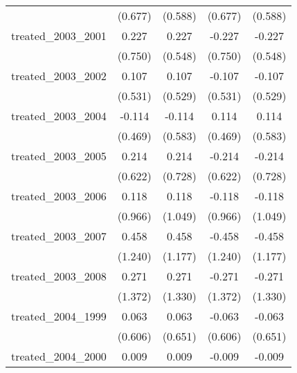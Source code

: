 {\begin{tabular}{l*{4}{c}}
            &     (0.677)         &     (0.588)         &     (0.677)         &     (0.588)         \\
[1em]
treated\_2003\_2001&       0.227         &       0.227         &      -0.227         &      -0.227         \\
            &     (0.750)         &     (0.548)         &     (0.750)         &     (0.548)         \\
[1em]
treated\_2003\_2002&       0.107         &       0.107         &      -0.107         &      -0.107         \\
            &     (0.531)         &     (0.529)         &     (0.531)         &     (0.529)         \\
[1em]
treated\_2003\_2004&      -0.114         &      -0.114         &       0.114         &       0.114         \\
            &     (0.469)         &     (0.583)         &     (0.469)         &     (0.583)         \\
[1em]
treated\_2003\_2005&       0.214         &       0.214         &      -0.214         &      -0.214         \\
            &     (0.622)         &     (0.728)         &     (0.622)         &     (0.728)         \\
[1em]
treated\_2003\_2006&       0.118         &       0.118         &      -0.118         &      -0.118         \\
            &     (0.966)         &     (1.049)         &     (0.966)         &     (1.049)         \\
[1em]
treated\_2003\_2007&       0.458         &       0.458         &      -0.458         &      -0.458         \\
            &     (1.240)         &     (1.177)         &     (1.240)         &     (1.177)         \\
[1em]
treated\_2003\_2008&       0.271         &       0.271         &      -0.271         &      -0.271         \\
            &     (1.372)         &     (1.330)         &     (1.372)         &     (1.330)         \\
[1em]
treated\_2004\_1999&       0.063         &       0.063         &      -0.063         &      -0.063         \\
            &     (0.606)         &     (0.651)         &     (0.606)         &     (0.651)         \\
[1em]
treated\_2004\_2000&       0.009         &       0.009         &      -0.009         &      -0.009         \\

\end{tabular}}
